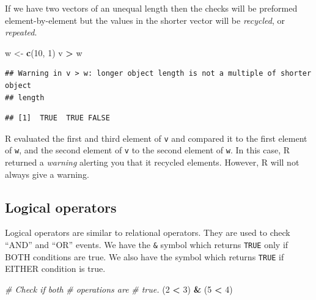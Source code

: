 \documentclass[
]{book}
\newenvironment{Shaded}{\begin{snugshade}}{\end{snugshade}}
\newcommand{\CommentTok}[1]{\textcolor[rgb]{0.56,0.35,0.01}{\textit{#1}}}
\newcommand{\DecValTok}[1]{\textcolor[rgb]{0.00,0.00,0.81}{#1}}
\newcommand{\KeywordTok}[1]{\textcolor[rgb]{0.13,0.29,0.53}{\textbf{#1}}}
\newcommand{\NormalTok}[1]{#1}
\newcommand{\OperatorTok}[1]{\textcolor[rgb]{0.81,0.36,0.00}{\textbf{#1}}}
\newcommand{\StringTok}[1]{\textcolor[rgb]{0.31,0.60,0.02}{#1}}
\begin{document}
If we have two vectors of an unequal length then the checks will be preformed element-by-element but the values in the shorter vector will be \emph{recycled}, or \emph{repeated}.

\begin{Shaded}
\begin{Highlighting}[]
\NormalTok{w <-}\StringTok{ }\KeywordTok{c}\NormalTok{(}\DecValTok{10}\NormalTok{, }\DecValTok{1}\NormalTok{)}
\NormalTok{v }\OperatorTok{>}\StringTok{ }\NormalTok{w}
\end{Highlighting}
\end{Shaded}

\begin{verbatim}
## Warning in v > w: longer object length is not a multiple of shorter object
## length
\end{verbatim}

\begin{verbatim}
## [1]  TRUE  TRUE FALSE
\end{verbatim}

R evaluated the first and third element of \texttt{v} and compared it to the first element of \texttt{w}, and the second element of \texttt{v} to the second element of \texttt{w}. In this case, R returned a \emph{warning} alerting you that it recycled elements. However, R will not always give a warning.

\hypertarget{logical-operators}{%
\subsection*{Logical operators}\label{logical-operators}}

Logical operators are similar to relational operators. They are used to check ``AND'' and ``OR'' events. We have the \texttt{\&} symbol which returns \texttt{TRUE} only if BOTH conditions are true. We also have the \texttt{\textbar{}} symbol which returns \texttt{TRUE} if EITHER condition is true.

\begin{Shaded}
\begin{Highlighting}[]
\CommentTok{# Check if both}
\CommentTok{# operations are}
\CommentTok{# true.}
\NormalTok{(}\DecValTok{2} \OperatorTok{<}\StringTok{ }\DecValTok{3}\NormalTok{) }\OperatorTok{&}\StringTok{ }\NormalTok{(}\DecValTok{5} \OperatorTok{<}\StringTok{ }\DecValTok{4}\NormalTok{)}
\end{Highlighting}
\end{Shaded}
\end{document}
